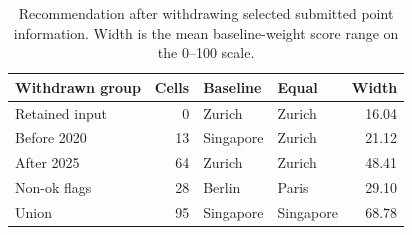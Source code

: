 \begin{table}[!ht]\centering
\caption{Recommendation after withdrawing selected submitted point information. Width is the mean baseline-weight score range on the 0--100 scale.}\label{tab:vintage}
\begin{tabular}{l r l l r}\toprule
Withdrawn group & Cells & Baseline & Equal & Width\\\midrule
Retained input & 0 & Zurich & Zurich & 16.04 \\
Before 2020 & 13 & Singapore & Zurich & 21.12 \\
After 2025 & 64 & Zurich & Zurich & 48.41 \\
Non-ok flags & 28 & Berlin & Paris & 29.10 \\
Union & 95 & Singapore & Singapore & 68.78 \\
\bottomrule\end{tabular}\end{table}
